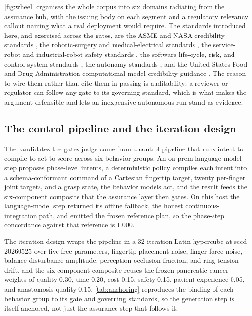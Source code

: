 \autoref{fig:wheel} organises the
whole corpus into six domains radiating from the assurance hub, with the issuing
body on each segment and a regulatory relevancy callout naming what a real
deployment would require. The standards introduced here, and exercised across the
gates, are the ASME and NASA credibility standards \cite{asmevv40, nasastd7009a},
the robotic-surgery and medical-electrical standards \cite{iec8060127, iec60601},
the service-robot and industrial-robot safety standards \cite{isots15066,
iso13482, iso10218, iso9283}, the software life-cycle, risk, and control-system
standards \cite{iec62304, iso14971, iso13849}, the autonomy standards
\cite{ul4600, ieee7009}, and the United States Food and Drug Administration
computational-model credibility guidance \cite{fda2023credibility}. The reason to
wire them rather than cite them in passing is auditability: a reviewer or
regulator can follow any gate to its governing standard, which is what makes the
argument defensible and lets an inexpensive autonomous run stand as evidence.

\clearpage

\subsection{The control pipeline and the iteration design}

The candidates the gates judge come from a control pipeline that runs intent to
compile to act to score across six behavior groups. An on-prem language-model
step proposes phase-level intents, a deterministic policy compiles each intent
into a schema-conformant command of a Cartesian fingertip target, twenty
per-finger joint targets, and a grasp state, the behavior models act, and the
result feeds the six-component composite that the assurance layer then gates. On
this host the language-model step returned its offline fallback, the honest
continuous-integration path, and emitted the frozen reference plan, so the
phase-step concordance against that reference is 1.000. 

The
iteration design wraps the pipeline in a 32-iteration Latin hypercube at seed
20260525 over five free parameters, fingertip placement noise, finger force
noise, balance disturbance amplitude, perception occlusion fraction, and ring
tension drift, and the six-component composite reuses the frozen pancreatic
cancer weights of quality 0.30, time 0.20, cost 0.15, safety 0.15, patient
experience 0.05, and anastomosis quality 0.15. \autoref{tab:anchoring} reproduces
the binding of each behavior group to its gate and governing standards, so the
generation step is itself anchored, not just the assurance step that follows it.

